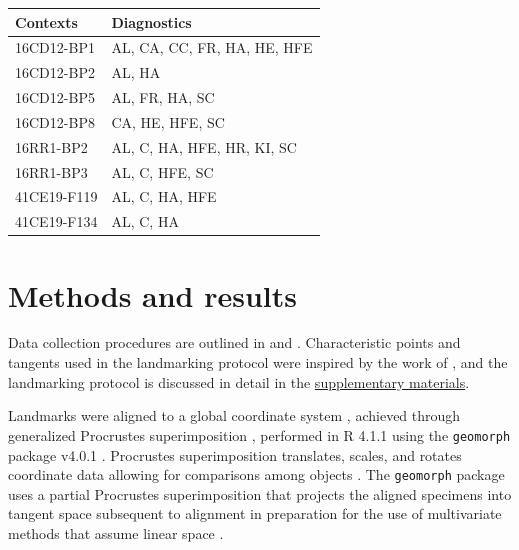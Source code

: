 \documentclass[]{interact}
\theoremstyle{plain}%
\theoremstyle{definition}
\theoremstyle{remark}
\begin{document}
\begin{table}
{\begin{tabular}{ll} \toprule
Contexts & Diagnostics \\
\midrule
16CD12-BP1 & AL, CA, CC, FR, HA, HE, HFE \\
16CD12-BP2 & AL, HA \\
16CD12-BP5 & AL, FR, HA, SC \\
16CD12-BP8 & CA, HE, HFE, SC \\
16RR1-BP2 & AL, C, HA, HFE, HR, KI, SC \\
16RR1-BP3 & AL, C, HFE, SC \\
41CE19-F119 & AL, C, HA, HFE \\
41CE19-F134 & AL, C, HA \\
\bottomrule
\end{tabular}}
\label{sample-table}
\end{table}

\hypertarget{methods-and-results}{%
\section{Methods and results}\label{methods-and-results}}

Data collection procedures are outlined in \cite{RN8154} and
\cite{RN8318}. Characteristic points and tangents used in the
landmarking protocol were inspired by the work of \cite{RN5700}, and the
landmarking protocol is discussed in detail in the
\href{https://seldenlab.github.io/gahaganmorph.3/}{supplementary
materials}.

Landmarks were aligned to a global coordinate system
\citep{RN8102,RN8587,RN8384}, achieved through generalized Procrustes
superimposition \citep{RN8525}, performed in R 4.1.1 \citep{RN8584}
using the \texttt{geomorph} package v4.0.1 \citep{RN8565,RN9565}.
Procrustes superimposition translates, scales, and rotates coordinate
data allowing for comparisons among objects \citep{RN5698,RN8525}. The
\texttt{geomorph} package uses a partial Procrustes superimposition that
projects the aligned specimens into tangent space subsequent to
alignment in preparation for the use of multivariate methods that assume
linear space \citep{RN8511,RN8384}.
\end{document}
